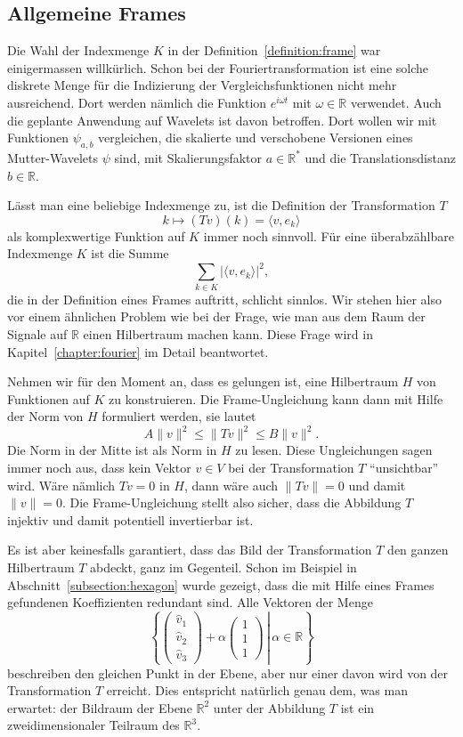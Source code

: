 %
%
\subsection{Allgemeine Frames}
Die Wahl der Indexmenge $K$ in der Definition~\ref{definition:frame}
war einigermassen willkürlich.
Schon bei der Fouriertransformation ist eine solche diskrete Menge
für die Indizierung der Vergleichsfunktionen nicht mehr ausreichend.
Dort werden nämlich die Funktion $e^{i\omega t}$ mit $\omega\in\mathbb R$
verwendet.
Auch die geplante Anwendung auf Wavelets ist davon betroffen.
Dort wollen wir mit Funktionen $\psi_{a,b}$ vergleichen, die 
skalierte und verschobene Versionen eines Mutter-Wavelets $\psi$ sind,
mit Skalierungsfaktor $a\in\mathbb R^*$ und die Translationsdistanz
$b\in \mathbb R$.
%
%

Lässt man eine beliebige Indexmenge zu, ist die Definition der
Transformation $T$
\[
k
\mapsto
(Tv)(k) = \langle v,e_k\rangle
\]
als komplexwertige Funktion auf $K$ immer noch sinnvoll.
Für eine überabzählbare Indexmenge $K$ ist die Summe 
\[
\sum_{k\in K} |\langle v,e_k\rangle|^2,
\]
die in der Definition eines Frames auftritt, schlicht sinnlos.
Wir stehen hier also vor einem ähnlichen Problem wie bei der Frage,
wie man aus dem Raum der Signale auf $\mathbb R$ einen Hilbertraum machen kann.
Diese Frage wird in Kapitel~\ref{chapter:fourier} im Detail beantwortet.

Nehmen wir für den Moment an, dass es gelungen ist, eine Hilbertraum $H$
von Funktionen auf $K$ zu konstruieren.
Die Frame-Ungleichung kann dann mit Hilfe der Norm von $H$ formuliert
werden, sie lautet
\[
A\|v\|^2 \le \|Tv\|^2 \le B\|v\|^2.
\]
Die Norm in der Mitte ist als Norm in $H$ zu lesen.
Diese Ungleichungen sagen immer noch aus, dass kein Vektor $v\in V$ bei
der Transformation $T$ ``unsichtbar'' wird.
Wäre nämlich $Tv=0$ in $H$, dann wäre auch $\|Tv\|=0$ und damit
$\|v\|=0$.
Die Frame-Ungleichung stellt also sicher, dass die Abbildung $T$ 
injektiv und damit potentiell invertierbar ist.

Es ist aber keinesfalls garantiert, dass das Bild der Transformation $T$
den ganzen Hilbertraum $T$ abdeckt, ganz im Gegenteil.
Schon im Beispiel in Abschnitt~\ref{subsection:hexagon} wurde gezeigt,
dass die mit Hilfe eines Frames gefundenen Koeffizienten redundant sind.
Alle Vektoren der Menge
\[
\left\{
\left.
\begin{pmatrix}\hat{v}_1\\\hat{v}_2\\\hat{v}_3\end{pmatrix}
+\alpha\begin{pmatrix}1\\1\\1\end{pmatrix}
\,
\right|\,
\alpha \in\mathbb R
\right\}
\]
beschreiben den gleichen Punkt in der Ebene, aber nur einer davon 
wird von der Transformation $T$ erreicht.
Dies entspricht natürlich genau dem, was man erwartet: der Bildraum
der Ebene $\mathbb R^2$ unter der Abbildung $T$ ist ein zweidimensionaler
Teilraum des $\mathbb R^3$.

